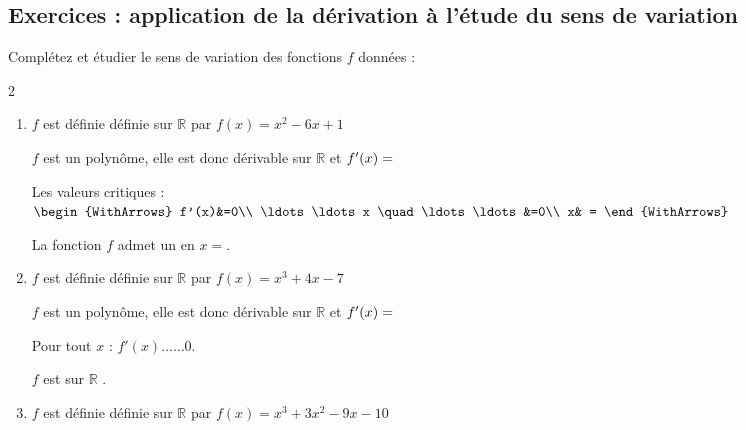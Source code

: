 \documentclass[main.tex]{subfiles}
\begin{document}
\subsection{Exercices : application de la dérivation à l'étude du sens de variation}
\begin{exercise} Complétez et étudier le sens de variation des fonctions $f$ données : \vspace{-1.0em}
\begin{spacing}{2}
\begin{enumerate}[leftmargin=*,label={\arabic*)}] 
\item 	$f$ est définie définie sur $\mathbb{R}$ par $f(x)=x^2-6x+1$
	
\noindent $f$ est un polynôme, elle est donc dérivable sur $\mathbb{R}$ et $f'(x)=\dotfill$  \bigskip

\noindent
\parbox{0.50\linewidth}{
		  Les valeurs critiques :\\
			$\begin{WithArrows}
				f'(x)&=0\\
				\ldots\ldots x \quad \ldots\ldots &=0\\
				x& = 
			\end{WithArrows}$ 
}\hfill 
\parbox{0.45\linewidth}{
}

La fonction $f$ admet un \dotfill en  $x=$\dotfill. 

\item \noindent	$f$ est définie définie sur $\mathbb{R}$ par $f(x)=x^3+4x-7$

\noindent $f$ est un polynôme, elle est donc dérivable sur $\mathbb{R}$ et $f'(x)=\dotfill$  \bigskip

\noindent
\parbox{0.45\linewidth}{
Pour tout $x$ : $f'(x) \ldots\ldots 0$.

$f$ est \dotfill sur $\mathbb{R}$ .  
}\hfill 
\parbox{0.55\linewidth}{
}
\item  	$f$ est définie définie sur $\mathbb{R}$ par $f(x)=x^3+3x^2-9x-10$


\end{enumerate}
\end{spacing}
\end{exercise}
\end{document}
